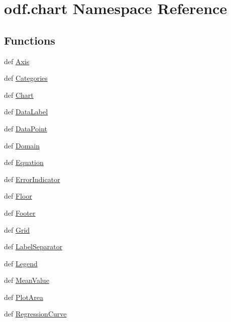 \hypertarget{namespaceodf_1_1chart}{\section{odf.\+chart Namespace Reference}
\label{namespaceodf_1_1chart}
}
\subsection*{Functions}
\begin{DoxyCompactItemize}
\item 
def \hyperlink{namespaceodf_1_1chart_a329874378a6b8d3670eb489cfc44f651}{Axis}
\item 
def \hyperlink{namespaceodf_1_1chart_aa82f78545efd652517ccc8717e7d40dd}{Categories}
\item 
def \hyperlink{namespaceodf_1_1chart_a68803758f9df5a37ff0dfadf736d38e0}{Chart}
\item 
def \hyperlink{namespaceodf_1_1chart_a179d1eaa90b948cceb2bbf4db776c6db}{Data\+Label}
\item 
def \hyperlink{namespaceodf_1_1chart_a1934c7d5dfbbe6a0e1d035f9559609d9}{Data\+Point}
\item 
def \hyperlink{namespaceodf_1_1chart_a069febad17f28421479d162744425132}{Domain}
\item 
def \hyperlink{namespaceodf_1_1chart_a521b13c9b125eab65fce28f5cd204248}{Equation}
\item 
def \hyperlink{namespaceodf_1_1chart_af8fb9968af1a26db725c3a7a25b659cf}{Error\+Indicator}
\item 
def \hyperlink{namespaceodf_1_1chart_aac2c903446e655fef725fbe15b501c24}{Floor}
\item 
def \hyperlink{namespaceodf_1_1chart_ae9f21dda3937bd3326ea5f9628fa9910}{Footer}
\item 
def \hyperlink{namespaceodf_1_1chart_a869f1e52109d7d02fdb2e6afa0486bc4}{Grid}
\item 
def \hyperlink{namespaceodf_1_1chart_a9a01025fc3d47bd002655343f1019eae}{Label\+Separator}
\item 
def \hyperlink{namespaceodf_1_1chart_a87d2416f717c7bcde696048089eb7c7b}{Legend}
\item 
def \hyperlink{namespaceodf_1_1chart_a21900789caa86f6a8e7ca11c47d697de}{Mean\+Value}
\item 
def \hyperlink{namespaceodf_1_1chart_af23c82b5fc6692cd81c51282643cd5b1}{Plot\+Area}
\item 
def \hyperlink{namespaceodf_1_1chart_a4317ee1ece08c161d7eb0b0374a5bcaf}{Regression\+Curve}

\end{DoxyCompactItemize}
